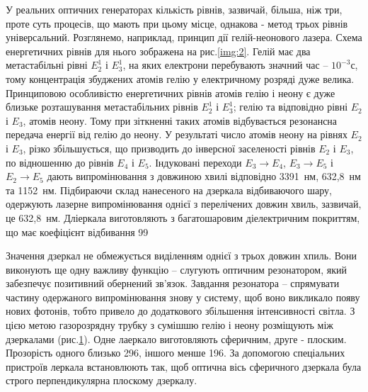 \documentclass[twocolumn]{el-author}
\begin{document}
У реальних оптичних генераторах кількість рівнів, зазвичай, більша, ніж три,
проте суть процесів, що мають при цьому місце, однакова - метод трьох
рівнів універсальний. Розглянемо, наприклад, принцип дії гелій-неонового
лазера. Схема енергетичних рівнів для нього зображена на рис.\ref{img:2}. 
Гелій має
два метастабільні рівні $E_{2}^{1}$ і $E_{3}^{1}$, 
на яких електрони перебувають значний час --
$10^{-3}$с, тому концентрація збуджених атомів гелію у електричному розряді
дуже велика. Принциповою особливістю енергетичних рівнів атомів гелію і
неону є дуже близьке розташування метастабільних рівнів $E_{2}^{1}$ і $E_{3}^{1}$; гелію та
відповідно рівні $E_{2}$ і $E_{3}$, атомів неону. Тому при зіткненні таких атомів
відбувається резонансна передача енергії від гелію до неону. У результаті
число атомів неону на рівнях $E_{2}$ і $E_{3}$, різко збільшується, що призводить до
інверсної заселеності рівнів $E_{2}$ і $E_{3}$, по відношенню до рівнів $E_{4}$ і $E_{5}$.
Індуковані переходи $E_{3} \to E_{4}$, $E_{3} \to E_{5}$ і $E_{2} \to E_{5}$ дають випромінювання з 
довжиною хвилі відповідно 3391~нм, 632,8~нм та 1152~нм. Підбираючи склад
нанесеного на дзеркала  відбиваючого шару, одержують лазерне
випромінювання однієї з перелічених довжин хвиль, зазвичай, це 632,8~нм.
Дліеркала виготовляють з багатошаровим діелектричним покриттям, що має
коефіцієнт відбивання 99%

Значення дзеркал не обмежується виділенням однієї з трьох довжин
хпиль. Вони виконують ще одну важливу функцію -- слугують оптичним
резонатором, який забезпечує позитивний обернений зв'язок. Завдання
резонатора -- спрямувати частину одержаного випромінювання знову у
систему, щоб воно викликало появу нових фотонів, тобто привело до
додаткового збільшення інтенсивності світла. З цією метою газорозрядну
трубку з сумішшю гелію і неону розміщують між дзеркалами (рис.\ref{img:3}). Одне
лаеркало виготовляють сферичним, друге - плоским. Прозорість одного
близько 296, іншого менше 196. За допомогою спеціальних пристроїв
леркала встановлюють так, щоб оптична вісь сферичного дзеркала була
строго перпендикулярна плоскому дзеркалу.

\begin{figure}[h]
\caption{\source{}}
\label{img:3}
\end{figure}
\end{document}
